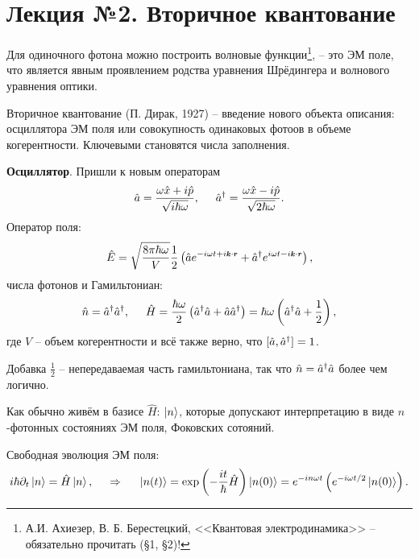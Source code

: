 \section*{Лекция №2. Вторичное квантование}



Для одиночного фотона можно построить волновые функции\footnote{
    А.И. Ахиезер, В. Б. Берестецкий, <<Квантовая электродинамика>> -- обязательно прочитать (\S 1, \S 2)!
}, -- это ЭМ поле, что является явным проявлением родства уравнения Шрёдингера и волнового уравнения оптики.


Вторичное квантование (П. Дирак, 1927) -- введение нового объекта описания: осциллятора ЭМ поля или совокупность одинаковых фотоов в объеме когерентности. Ключевыми становятся числа заполнения. 


\textbf{Осциллятор}. Пришли к новым операторам
\begin{equation*}
    \hat{a} = \frac{\omega \hat{x} + i \hat{p}}{\sqrt{i \hbar \omega}},
    \hspace{5 mm} 
    \hat{a}^\dagger = \frac{\omega \hat{x} - i \hat{p}}{\sqrt{2 \hbar \omega}}.
\end{equation*}
Оператор поля:
\begin{equation*}
    \hat{E} = \sqrt{\frac{8 \pi \hbar \omega}{V}} \frac{1}{2}\left(
        \hat{a} e^{- i \omega t + i \smallvc{k} \cdot \smallvc{r}} + 
        \hat{a}^\dagger e^{i \omega t - i \smallvc{k} \cdot \smallvc{r}}
    \right),
\end{equation*}
числа фотонов и Гамильтониан:
\begin{equation*}
    \hat{n} = \hat{a}^\dagger \hat{a}^\dagger,
    \hspace{5 mm} 
    \hat{H} = \frac{\hbar \omega}{2} \left(\hat{a}^\dagger \hat{a} + \hat{a} \hat{a}^\dagger\right)= \hbar \omega \left(\hat{a}^\dagger \hat{a} + \frac{1}{2}\right),
\end{equation*}
где $V$ -- объем когерентности и всё также верно, что $[\hat{a}, \hat{a}^\dagger] = 1$.

Добавка $\frac{1}{2}$ -- непередаваемая часть гамильтониана, так что $\hat{n} = \hat{a}^\dagger \hat{a}$ более чем логично.


Как обычно живём в базисе $\hat{H}$: $\left| n \right\rangle$, которые допускают интерпретацию в виде $n$-фотонных состояниях ЭМ поля, Фоковских сотояний.

Свободная эволюция ЭМ поля:
\begin{equation*}
    i \hbar \partial_t \left| n \right\rangle = \hat{H} \left| n \right\rangle,
    \hspace{0.5cm} \Rightarrow \hspace{0.5cm}
    \left| n(t) \right\rangle = \exp\left(
        - \frac{it}{\hbar} \hat{H}
    \right) \left| n(0) \right\rangle = e^{- i n \omega t} \left(
        e^{- i \omega t/2} \left| n(0) \right\rangle
    \right).
\end{equation*}

